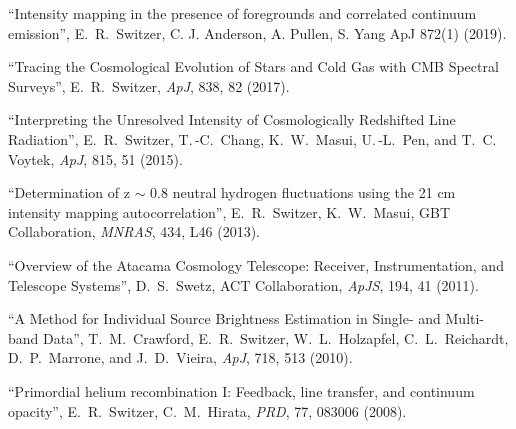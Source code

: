 \item ``Intensity mapping in the presence of foregrounds and correlated continuum emission'', E.\, R.\, Switzer, C. J. Anderson, A. Pullen, S. Yang ApJ 872(1) (2019).
\item ``Tracing the Cosmological Evolution of Stars and Cold Gas with CMB Spectral Surveys'', E.\, R.\, Switzer, {\it ApJ}, 838, 82 (2017).
\item ``Interpreting the Unresolved Intensity of Cosmologically Redshifted Line Radiation'', E.\, R.\, Switzer, T.\,-C.\, Chang, K.\, W.\, Masui, U.\,-L.\, Pen, and T.\, C.\, Voytek, {\it ApJ}, 815, 51 (2015).
\item ``Determination of z $\sim$ 0.8 neutral hydrogen fluctuations using the 21 cm intensity mapping autocorrelation'', E.\, R.\, Switzer, K.\, W.\, Masui, GBT Collaboration, {\it MNRAS}, 434, L46 (2013).
\item ``Overview of the Atacama Cosmology Telescope: Receiver, Instrumentation, and Telescope Systems'', D.\, S.\, Swetz, ACT Collaboration, {\it ApJS}, 194, 41 (2011).
\item ``A Method for Individual Source Brightness Estimation in Single- and Multi-band Data'', T.\, M.\, Crawford, E.\, R.\, Switzer, W.\, L.\, Holzapfel, C.\, L.\, Reichardt, D.\, P.\, Marrone, and J.\, D.\, Vieira, {\it ApJ}, 718, 513 (2010).
\item ``Primordial helium recombination I: Feedback, line transfer, and continuum opacity'', E.\, R.\, Switzer, C.\, M.\, Hirata, {\it PRD}, 77, 083006 (2008).
